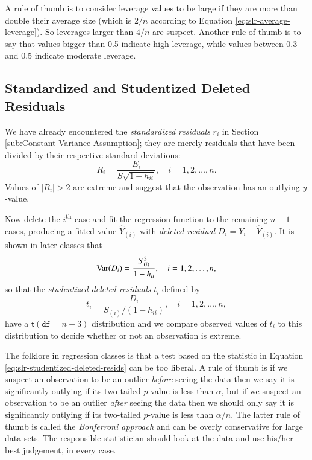 \documentclass[captions=tableheading]{scrbook}
\begin{document}
A rule of thumb is to consider leverage values to be large if they are more than double their average size (which is \(2/n\) according to Equation \ref{eq:slr-average-leverage}). So leverages larger than \(4/n\) are suspect. Another rule of thumb is to say that values bigger than 0.5 indicate high leverage, while values between 0.3 and 0.5 indicate moderate leverage.
\subsection{Standardized and Studentized Deleted Residuals}
\label{sec-11-5-3}


We have already encountered the \emph{standardized residuals} \(r_{i}\) in Section \ref{sub:Constant-Variance-Assumption}; they are merely residuals that have been divided by their respective standard deviations: 
\begin{equation}
R_{i}=\frac{E_{i}}{S\sqrt{1-h_{ii}}},\quad i=1,2,\ldots,n.
\end{equation}
Values of \(|R_{i}| > 2\) are extreme and suggest that the observation has an outlying \(y\)-value. 

Now delete the \(i^{\mathrm{th}}\) case and fit the regression function to the remaining \(n - 1\) cases, producing a fitted value \(\hat{Y}_{(i)}\) with \emph{deleted residual} \(D_{i}=Y_{i}-\hat{Y}_{(i)}\). It is shown in later classes that 
\begin{equation}
\mbox{Var\ensuremath{(D_{i})}}=\frac{S_{(i)}^{2}}{1-h_{ii}},\quad i=1,2,\ldots,n,
\end{equation}
so that the \emph{studentized deleted residuals} \(t_{i}\) defined by
\begin{equation}
t_{i}=\frac{D_{i}}{S_{(i)}/(1-h_{ii})},\quad i=1,2,\ldots,n,\label{eq:slr-studentized-deleted-resids}
\end{equation}
have a \(\mathsf{t}(\mathtt{df}=n-3)\) distribution and we compare observed values of \(t_{i}\) to this distribution to decide whether or not an observation is extreme. 

The folklore in regression classes is that a test based on the statistic in Equation \ref{eq:slr-studentized-deleted-resids} can be too liberal. A rule of thumb is if we suspect an observation to be an outlier \emph{before} seeing the data then we say it is significantly outlying if its two-tailed \(p\)-value is less than \(\alpha\), but if we suspect an observation to be an outlier \emph{after} seeing the data then we should only say it is significantly outlying if its two-tailed \(p\)-value is less than \(\alpha/n\). The latter rule of thumb is called the \emph{Bonferroni approach} and can be overly conservative for large data sets. The responsible statistician should look at the data and use his/her best judgement, in every case.
\end{document}

